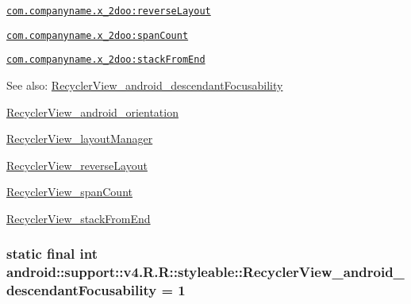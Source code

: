 {\tt \hyperlink{classandroid_1_1support_1_1v4_1_1_r_1_1styleable_1e1cc171f4107ce021536bcce00230c6}{com.companyname.x\_\-2doo:reverseLayout}}

{\tt \hyperlink{classandroid_1_1support_1_1v4_1_1_r_1_1styleable_5a5fe0e2fd166ebd52eb768888d065db}{com.companyname.x\_\-2doo:spanCount}}

{\tt \hyperlink{classandroid_1_1support_1_1v4_1_1_r_1_1styleable_41dd2629b266247a80ee2bacd4525923}{com.companyname.x\_\-2doo:stackFromEnd}}

\begin{Desc}
\item[See also:]\hyperlink{classandroid_1_1support_1_1v4_1_1_r_1_1styleable_08c04653d12c32cd2312f55a2e1e68a9}{RecyclerView\_\-android\_\-descendantFocusability} 

\hyperlink{classandroid_1_1support_1_1v4_1_1_r_1_1styleable_e008924d6df8616aad567584258f56bf}{RecyclerView\_\-android\_\-orientation} 

\hyperlink{classandroid_1_1support_1_1v4_1_1_r_1_1styleable_fb053f97984703efea988f5a33cc13a8}{RecyclerView\_\-layoutManager} 

\hyperlink{classandroid_1_1support_1_1v4_1_1_r_1_1styleable_1e1cc171f4107ce021536bcce00230c6}{RecyclerView\_\-reverseLayout} 

\hyperlink{classandroid_1_1support_1_1v4_1_1_r_1_1styleable_5a5fe0e2fd166ebd52eb768888d065db}{RecyclerView\_\-spanCount} 

\hyperlink{classandroid_1_1support_1_1v4_1_1_r_1_1styleable_41dd2629b266247a80ee2bacd4525923}{RecyclerView\_\-stackFromEnd} \end{Desc}
\hypertarget{classandroid_1_1support_1_1v4_1_1_r_1_1styleable_08c04653d12c32cd2312f55a2e1e68a9}{
\subsubsection[{RecyclerView\_\-android\_\-descendantFocusability}]{\setlength{\rightskip}{0pt plus 5cm}static final int android::support::v4.R.R::styleable::RecyclerView\_\-android\_\-descendantFocusability = 1}}
\label{classandroid_1_1support_1_1v4_1_1_r_1_1styleable_08c04653d12c32cd2312f55a2e1e68a9}


